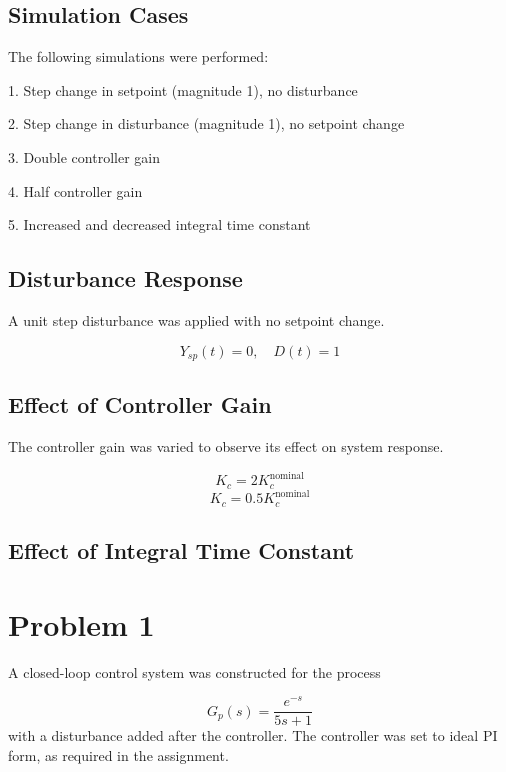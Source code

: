 \documentclass{article}%
\begin{document}
%
\subsection*{Simulation Cases}%
\label{subsec:SimulationCases}%
The following simulations were performed:%
\par%
1. Step change in setpoint (magnitude 1), no disturbance%
\par%
2. Step change in disturbance (magnitude 1), no setpoint change%
\par%
3. Double controller gain%
\par%
4. Half controller gain%
\par%
5. Increased and decreased integral time constant%
\par

%
\subsection*{Disturbance Response}%
\label{subsec:DisturbanceResponse}%
A unit step disturbance was applied with no setpoint change.%
\par%
\[%
Y_{sp}(t) = 0, \quad D(t) = 1%
\]

%
\subsection*{Effect of Controller Gain}%
\label{subsec:EffectofControllerGain}%
The controller gain was varied to observe its effect on system response.%
\par%
\[%
K_c = 2K_c^{\text{nominal}}%
\]%
\[%
K_c = 0.5K_c^{\text{nominal}}%
\]

%
\subsection*{Effect of Integral Time Constant}%
\label{subsec:EffectofIntegralTimeConstant}%

%
\section*{Problem 1}%
\label{sec:Problem1}%
A closed{-}loop control system was constructed for the process%
\par%
\[%
G_p(s)=\frac{e^{-s}}{5s+1}%
\]%
with a disturbance added after the controller. The controller was set to ideal PI form, as required in the assignment.%
\par%
\end{document}
